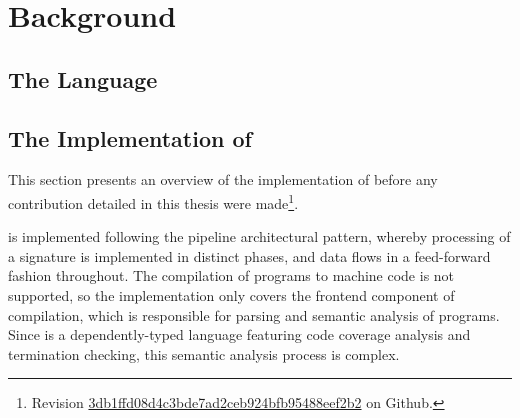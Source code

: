 \chapter{Background}

\section{The \Beluga Language}

\section{The Implementation of \Beluga} \label{section:beluga-implementation}

This section presents an overview of the implementation of \Beluga before any contribution detailed in this thesis were made\footnote{Revision \href{https://github.com/Beluga-lang/Beluga/tree/3db1ffd08d4c3bde7ad2ceb924bfb95488eef2b2}{3db1ffd08d4c3bde7ad2ceb924bfb95488eef2b2} on Github.}.

\Beluga is implemented following the pipeline architectural pattern, whereby processing of a \Beluga signature is implemented in distinct phases, and data flows in a feed-forward fashion throughout.
The compilation of \Beluga programs to machine code is not supported, so the implementation only covers the frontend component of compilation, which is responsible for parsing and semantic analysis of programs.
Since \Beluga is a dependently-typed language featuring code coverage analysis and termination checking, this semantic analysis process is complex.

